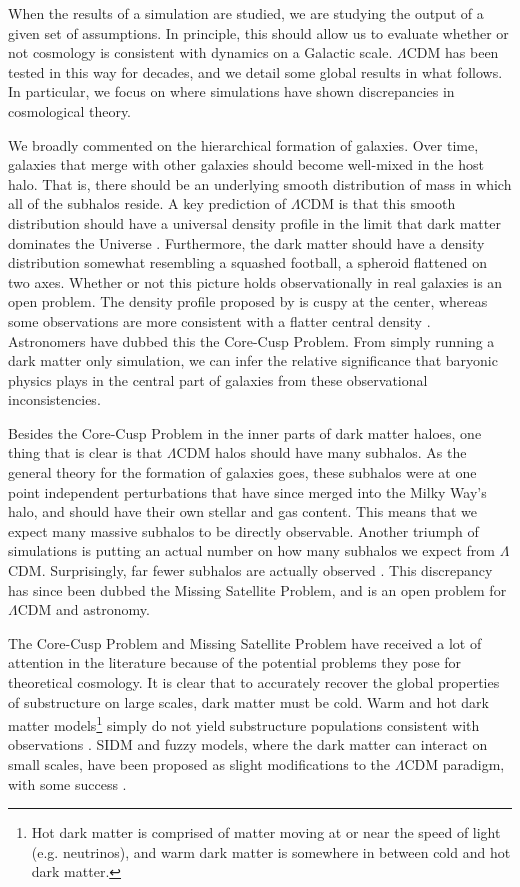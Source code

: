 When the results of a simulation are studied, we are studying the output of a given set of assumptions. In principle, this should allow us to evaluate whether or not cosmology is consistent with dynamics on a Galactic scale. $\Lambda$CDM has been tested in this way for decades, and we detail some global results in what follows. In particular, we focus on where simulations have shown discrepancies in cosmological theory.

We broadly commented on the hierarchical formation of galaxies. Over time, galaxies that merge with other galaxies should become well-mixed in the host halo. That is, there should be an underlying smooth distribution of mass in which all of the subhalos reside. A key prediction of $\Lambda$CDM is that this smooth distribution should have a universal density profile in the limit that dark matter dominates the Universe \citep{nfw}. Furthermore, the dark matter should have a density distribution somewhat resembling a squashed football, a spheroid flattened on two axes. Whether or not this picture holds observationally in real galaxies is an open problem. The density profile proposed by \citet{nfw} is cuspy at the center, whereas some observations are more consistent with a flatter central density \citep{de_blok_core_cusp}. Astronomers have dubbed this the Core-Cusp Problem. From simply running a dark matter only simulation, we can infer the relative significance that baryonic physics plays in the central part of galaxies from these observational inconsistencies.

Besides the Core-Cusp Problem in the inner parts of dark matter haloes, one thing that is clear is that $\Lambda$CDM halos should have many subhalos. As the general theory for the formation of galaxies goes, these subhalos were at one point independent perturbations that have since merged into the Milky Way's halo, and should have their own stellar and gas content. This means that we expect many massive subhalos to be directly observable. Another triumph of simulations is putting an actual number on how many subhalos we expect from $\Lambda$CDM. Surprisingly, far fewer subhalos are actually observed \citep{mooresubhalos, Klypin1999, springel2008}. This discrepancy has since been dubbed the Missing Satellite Problem, and is an open problem for $\Lambda$CDM and astronomy.


The Core-Cusp Problem and Missing Satellite Problem have received a lot of attention in the literature because of the potential problems they pose for theoretical cosmology. It is clear that to accurately recover the global properties of substructure on large scales, dark matter must be cold. Warm and hot dark matter models\footnote{Hot dark matter is comprised of matter moving at or near the speed of light (e.g. neutrinos), and warm dark matter is somewhere in between cold and hot dark matter.} simply do not yield substructure populations consistent with observations \citep[for example]{alternate_dm}. SIDM and fuzzy models, where the dark matter can interact on small scales, have been proposed as slight modifications to the $\Lambda$CDM paradigm, with some success \citep[for example]{hui_2017}. 

